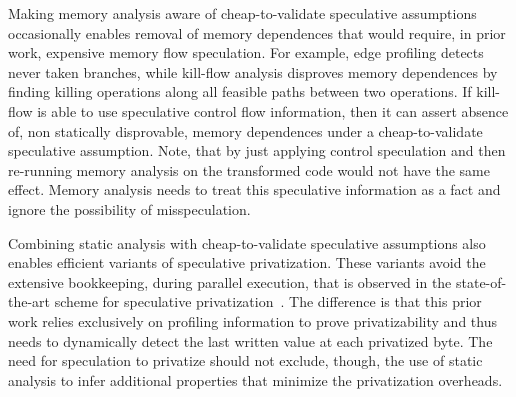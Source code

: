Making memory analysis aware of cheap-to-validate speculative
assumptions occasionally enables removal of memory dependences that
would require, in prior work, expensive memory flow speculation.
%
For example,
edge profiling detects never taken branches, while kill-flow analysis
disproves memory dependences by finding killing operations along all
feasible paths between two operations. If kill-flow is able to use
speculative control flow information, then it can assert absence of,
non statically disprovable, memory dependences under a
cheap-to-validate speculative assumption.
%
Note, that by just applying control speculation and then re-running
memory analysis on the transformed code would not have the same
effect.  Memory analysis needs to treat this speculative information
as a fact and ignore the possibility of misspeculation.

Combining static analysis with cheap-to-validate speculative
assumptions also enables efficient variants of speculative
privatization.
%
These variants avoid the extensive bookkeeping, during parallel
execution, that is observed in the state-of-the-art scheme for
speculative privatization~\cite{johnson:12:pldi}.
%
The difference is that this prior work relies exclusively on profiling
information to prove privatizability and thus needs to dynamically
detect the last written value at each privatized byte.
%
The need for speculation to privatize should not exclude, though, the
use of static analysis to infer additional properties that minimize
the privatization overheads.

%
%

%
%

